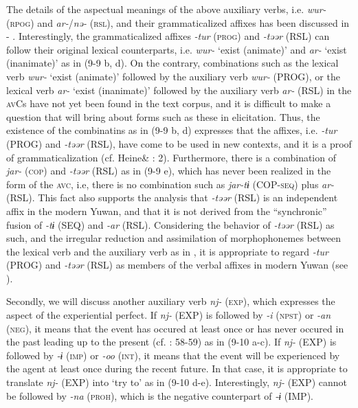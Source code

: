 The details of the aspectual meanings of the above auxiliary verbs, i.e. \textit{wur-} (\textsc{rpog}) and \textit{ar-}/\textit{nə-} (\textsc{rsl}), and their grammaticalized affixes has been discussed in  - . Interestingly, the grammaticalized affixes \textit{{}-tur} (\textsc{prog}) and \textit{{}-təər} (RSL) can follow their original lexical counterparts, i.e. \textit{wur-} ‘exist (animate)’ and \textit{ar-} ‘exist (inanimate)’ as in (9-9 b, d). On the contrary, combinations such as the lexical verb \textit{wur-} ‘exist (animate)’ followed by the auxiliary verb \textit{wur-} (PROG), or the lexical verb \textit{ar-} ‘exist (inanimate)’ followed by the auxiliary verb \textit{ar-} (RSL) in the \textsc{av}Cs have not yet been found in the text corpus, and it is difficult to make a question that will bring about forms such as these in elicitation. Thus, the existence of the combinatins as in (9-9 b, d) expresses that the affixes, i.e. \textit{{}-tur} (PROG) and \textit{{}-təər} (RSL), have come to be used in new contexts, and it is a proof of grammaticalization (cf. Heine\& \citealt{Kuteva2002}: 2). Furthermore, there is a combination of \textit{jar-} (\textsc{cop}) and \textit{{}-təər} (RSL) as in (9-9 e), which has never been realized in the form of the \textsc{avc}, i.e, there is no combination such as \textit{jar-tɨ} (COP-\textsc{seq}) plus \textit{ar-} (RSL). This fact also supports the analysis that \textit{{}-təər} (RSL) is an independent affix in the modern Yuwan, and that it is not derived from the “synchronic” fusion of \textit{{}-tɨ} (SEQ) and \textit{{}-ar} (RSL). Considering the behavior of \textit{{}-təər} (RSL) as such, and the irregular reduction and assimilation of morphophonemes between the lexical verb and the auxiliary verb as in , it is appropriate to regard \textit{{}-tur} (PROG) and \textit{{}-təər} (RSL) as members of the verbal affixes in modern Yuwan (see ).

Secondly, we will discuss another auxiliary verb \textit{nj-} (\textsc{exp}), which expresses the aspect of the experiential perfect. If \textit{nj-} (EXP) is followed by \textit{{}-i} (\textsc{npst}) or \textit{{}-an} (\textsc{neg}), it means that the event has occured at least once or has never occured in the past leading up to the present (cf. \citealt{Comrie1976}: 58-59) as in (9-10 a-c). If \textit{nj-} (EXP) is followed by \textit{{}-ɨ} (\textsc{imp}) or \textit{{}-oo} (\textsc{int}), it means that the event will be experienced by the agent at least once during the recent future. In that case, it is appropriate to translate \textit{nj-} (EXP) into ‘try to’ as in (9-10 d-e). Interestingly, \textit{nj-} (EXP) cannot be followed by \textit{{}-na} (\textsc{proh}), which is the negative counterpart of \textit{{}-ɨ} (IMP).

